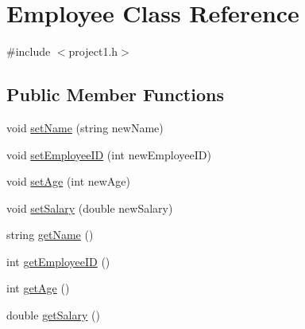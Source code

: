 \hypertarget{class_employee}{\section{Employee Class Reference}
\label{class_employee}
}


{\ttfamily \#include $<$project1.\-h$>$}

\subsection*{Public Member Functions}
\begin{DoxyCompactItemize}
\item 
void \hyperlink{class_employee_a4c53ac2f9d2f2d290a3020b0e6fcad77}{set\-Name} (string new\-Name)
\item 
void \hyperlink{class_employee_a829a37474319e9860fddb7b9d0ddcdbe}{set\-Employee\-I\-D} (int new\-Employee\-I\-D)
\item 
void \hyperlink{class_employee_aae3129c579be64c927d130541bea8ea0}{set\-Age} (int new\-Age)
\item 
void \hyperlink{class_employee_a9ae4e6c25f382dd5c563bd43cbe45753}{set\-Salary} (double new\-Salary)
\item 
string \hyperlink{class_employee_ab2476ea9935bcc3417c41e48c4f1b297}{get\-Name} ()
\item 
int \hyperlink{class_employee_a62cea8aa9797ef4eca5dec1cf1bf4b4c}{get\-Employee\-I\-D} ()
\item 
int \hyperlink{class_employee_a96060edcf83d11b1ec904bf50fa42e9b}{get\-Age} ()
\item 
double \hyperlink{class_employee_a90bba58cb74e7956cc133e93b4d74cb8}{get\-Salary} ()
\end{DoxyCompactItemize}


